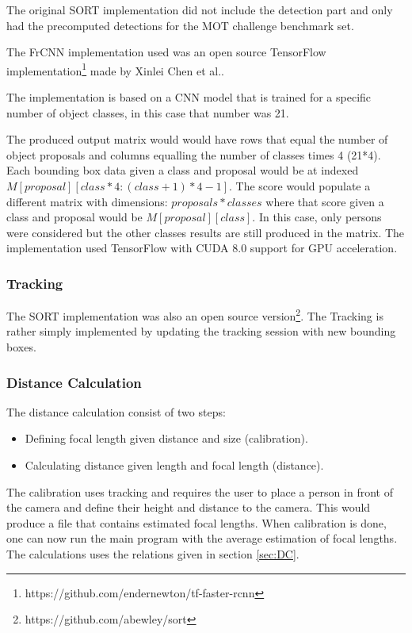 \documentclass[a4paper]{article}
\begin{document}
The original SORT implementation did not include the detection part and only had the precomputed detections for the MOT challenge benchmark set. 

The FrCNN implementation used was an open source TensorFlow implementation\footnote{https://github.com/endernewton/tf-faster-rcnn} made by Xinlei Chen et al.\cite{chen17implementation}.

The implementation is based on a CNN model that is trained for a specific number of object classes, in this case that number was 21.

The produced output matrix would would have rows that equal the number of object proposals and columns equalling the number of classes times 4 (21*4).
Each bounding box data given a class and proposal would be at indexed $M[proposal][class*4:(class+1)*4-1]$.
The score would populate a different matrix with dimensions: $proposals * classes$ where that score given a class and proposal would be $M[proposal][class]$.
In this case, only persons were considered but the other classes results are still produced in the matrix.
The implementation used TensorFlow with CUDA 8.0 support for GPU acceleration.

\subsubsection{Tracking}

The SORT implementation was also an open source version\footnote{https://github.com/abewley/sort}\cite{Bewley2016_sort}.
The Tracking is rather simply implemented by updating the tracking session with new bounding boxes.

\subsubsection{Distance Calculation}

The distance calculation consist of two steps:
\begin{itemize}
\item Defining focal length given distance and size (calibration).
\item Calculating distance given length and focal length (distance).
\end{itemize}

The calibration uses tracking and requires the user to place a person in front of the camera and define their height and distance to the camera.
This would produce a file that contains estimated focal lengths.
When calibration is done, one can now run the main program with the average estimation of focal lengths.
The calculations uses the relations given in section \ref{sec:DC}.
\end{document}

